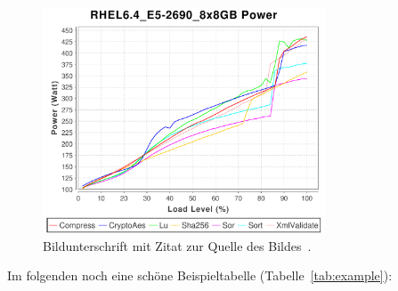 \documentclass[runningheads,a4paper]{uwsese}
\begin{document}
\begin{figure}[t]
\begin{center}
\includegraphics[trim=0cm 0cm 0cm 1cm, clip=true,width = 8.4cm]{graphics/RHEL6_4_E5-2690_8x8GB_p_truex50.pdf}
\caption{Bildunterschrift mit Zitat zur Quelle des Bildes~\cite{KiBlBeLaArKo2015-ICPE-SERT}.}
\label{fig:example}
\end{center}
\end{figure}

Im folgenden noch eine schöne Beispieltabelle (Tabelle~\ref{tab:example}):
\end{document}
